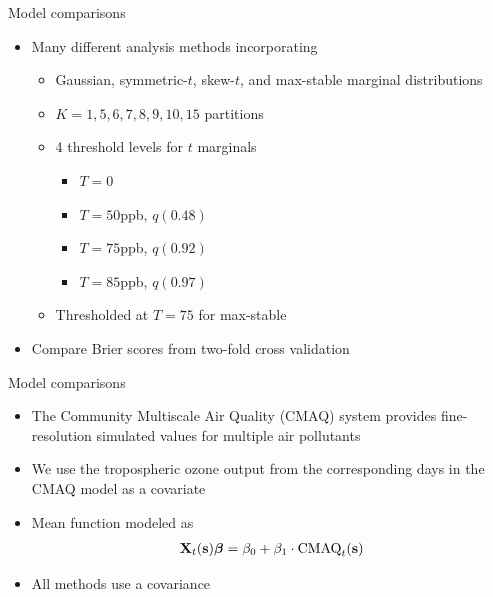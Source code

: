 \documentclass{beamer}
\begin{document}
\begin{frame}{Model comparisons}
  \begin{itemize} \setlength{\itemsep}{1em}
    \item Many different analysis methods incorporating \vspace{0.5em}
    \begin{itemize} \setlength{\itemsep}{0.5em}
      \item Gaussian, symmetric-$t$, skew-$t$, and max-stable marginal distributions
      \item $K=1, 5, 6, 7, 8, 9, 10, 15$ partitions
      \item 4 threshold levels for $t$ marginals \vspace{0.25em}
      \begin{itemize} \setlength{\itemsep}{0.25em}
         \item $T = 0$
         \item $T = 50$ppb, $q(0.48)$
         \item $T = 75$ppb, $q(0.92)$
         \item $T = 85$ppb, $q(0.97)$
      \end{itemize}
      \item Thresholded at $T = 75$ for max-stable
    \end{itemize}
    \item Compare Brier scores from two-fold cross validation
  \end{itemize}
\end{frame}

\begin{frame}{Model comparisons}
  \begin{itemize} \setlength{\itemsep}{1em}
    \item The Community Multiscale Air Quality (CMAQ) system provides fine-resolution simulated values for multiple air pollutants
    \item We use the tropospheric ozone output from the corresponding days in the CMAQ model as a covariate
    \item Mean function modeled as
    \begin{align*}
    	\mbox{\bf X}_t(\mbox{\bf s}) \mbox{\boldmath $\beta$} = \beta_0 + \beta_1 \cdot \text{CMAQ}_t (\mbox{\bf s})
    \end{align*}
    \item All methods use a \Matern covariance
   \end{itemize}
\end{frame}
\end{document}
